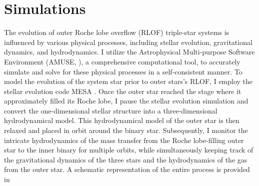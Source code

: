 \chapter{Simulations}


The evolution of outer Roche lobe overflow (RLOF) triple-star systems is influenced by various physical processes, including stellar evolution, gravitational dynamics, and hydrodynamics. I utilize the Astrophysical Multi-purpose Software Environment (AMUSE, \cite{portegies2018astrophysical}), a comprehensive computational tool, to accurately simulate and solve for these physical processes in a self-consistent manner. To model the evolution of the system star prior to outer stars's RLOF, I employ the stellar evolution code MESA \citep{paxton2010modules,paxton2013modules,paxton2015modules,paxton2019modules}. Once the outer star reached the stage where it approximately filled its Roche lobe, I pause the stellar evolution simulation and convert the one-dimensional stellar structure into a three-dimensional hydrodynamical model. This hydrodynamical model of the outer star is then relaxed and placed in orbit around the binary star. Subsequently, I monitor the intricate hydrodynamics of the mass transfer from the Roche lobe-filling outer star to the inner binary for multiple orbits, while simultaneously keeping track of the gravitational dynamics of the three stars and the hydrodynamics of the gas from the outer star. A schematic representation of the entire process is provided in 

